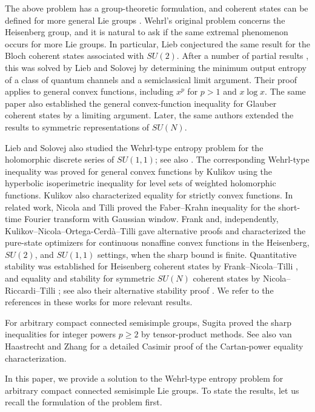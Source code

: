 \documentclass[11pt,reqno]{amsart}
\numberwithin{equation}{section}
\theoremstyle{plain}
\theoremstyle{remark}
\begin{document}
The above problem has a group-theoretic formulation, and coherent states can be defined
for more general Lie groups \cite{Perelomov}. Wehrl's original problem concerns the Heisenberg group, and it is natural to ask if the same extremal phenomenon occurs for more Lie groups. In particular, Lieb \cite{Lieb} conjectured the same result for the Bloch
coherent states associated with $SU(2)$. After a number of partial results \cite{Bodmann,Gnutzmann,Schupp}, this was solved by Lieb and Solovej
\cite{LS2} by determining the minimum output entropy of a class of quantum channels and a semiclassical limit argument.
Their proof applies to general convex functions, including $x^p$ for $p>1$ and $x\log x$.
The same paper also established the general convex-function inequality for Glauber coherent states by a limiting argument.
Later, the same authors \cite{LS} extended the results to symmetric representations of $SU(N)$.

Lieb and Solovej \cite{LS11} also studied the Wehrl-type entropy problem
for the holomorphic discrete series of $SU(1,1)$; see also \cite{Bandyopadhyay,Bayart}. The corresponding
Wehrl-type inequality was proved for general convex functions by Kulikov
\cite{Kulikov} using the hyperbolic isoperimetric inequality for level
sets of weighted holomorphic functions.
Kulikov also characterized equality for strictly convex functions.
In related work, Nicola and Tilli \cite{NT} proved the Faber--Krahn inequality for the short-time Fourier
transform with Gaussian window.
Frank \cite{Frank} and, independently,
Kulikov--Nicola--Ortega-Cerd\`a--Tilli \cite{KNOT}
gave alternative proofs and characterized the pure-state optimizers for
continuous nonaffine convex functions in the Heisenberg, $SU(2)$, and $SU(1,1)$
settings, when the sharp bound is finite.
Quantitative stability was established for Heisenberg coherent states by
Frank--Nicola--Tilli \cite{FNT}, and equality and stability for symmetric
$SU(N)$ coherent states by Nicola--Riccardi--Tilli \cite{NRT};
see also their alternative stability proof \cite{NRTsecond}.
We refer to the references in these works for more relevant results.

For arbitrary compact connected semisimple groups, Sugita \cite{Sugita,SugitaMoments} proved the
sharp inequalities for integer powers $p\ge2$ by tensor-product methods.
See also van Haastrecht and Zhang \cite[Appendix~A]{HZ} for a detailed
Casimir proof of the Cartan-power equality characterization.

\medskip

In this paper, we provide a solution to the Wehrl-type entropy problem for
arbitrary compact connected semisimple Lie groups. To state the results, let us recall the formulation of the problem first.
\end{document}
